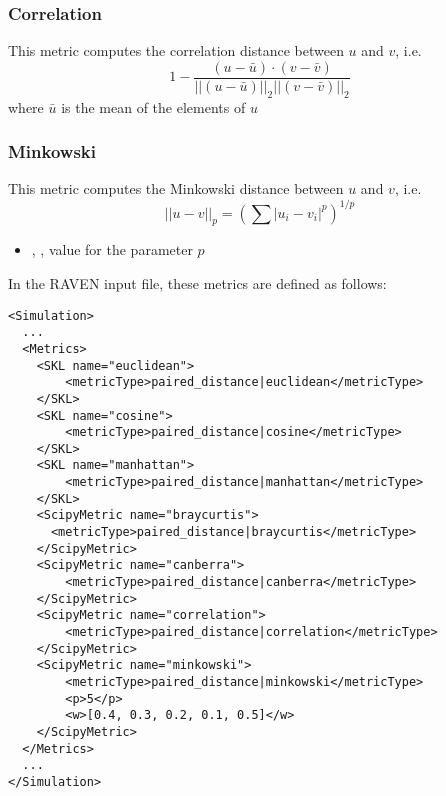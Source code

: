
\subsubsection{Correlation}
This metric computes the correlation distance between $u$ and $v$, i.e.
\begin{equation}
  1 - \frac{(u - \bar{u}) \cdot (v - \bar{v})}{{||(u - \bar{u})||}_2 {||(v - \bar{v})||}_2}
\end{equation}
where $\bar{u}$ is the mean of the elements of $u$


\subsubsection{Minkowski}
This metric computes the Minkowski distance between $u$ and $v$, i.e.
\begin{equation}
  {||u-v||}_p = (\sum{|u_i - v_i|^p})^{1/p}
\end{equation}


\begin{itemize}
  \item {}, , value for the parameter $p$
\end{itemize}

In the RAVEN input file, these metrics are defined as follows:
\begin{lstlisting}[style=XML]
<Simulation>
  ...
  <Metrics>
    <SKL name="euclidean">
        <metricType>paired_distance|euclidean</metricType>
    </SKL>
    <SKL name="cosine">
        <metricType>paired_distance|cosine</metricType>
    </SKL>
    <SKL name="manhattan">
        <metricType>paired_distance|manhattan</metricType>
    </SKL>
    <ScipyMetric name="braycurtis">
      <metricType>paired_distance|braycurtis</metricType>
    </ScipyMetric>
    <ScipyMetric name="canberra">
        <metricType>paired_distance|canberra</metricType>
    </ScipyMetric>
    <ScipyMetric name="correlation">
        <metricType>paired_distance|correlation</metricType>
    </ScipyMetric>
    <ScipyMetric name="minkowski">
        <metricType>paired_distance|minkowski</metricType>
        <p>5</p>
        <w>[0.4, 0.3, 0.2, 0.1, 0.5]</w>
    </ScipyMetric>
  </Metrics>
  ...
</Simulation>
\end{lstlisting}

